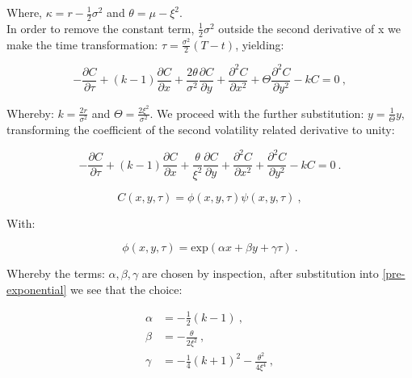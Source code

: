 \documentclass[english,12pt]{article}
\begin{document}
Where, $\kappa = r - \frac{1}{2}{\sigma^{2}}$ and $\theta = \mu - \xi^2$.
\\
\indent In order to remove the constant term, $\frac{1}{2}{\sigma^{2}}$ outside the second derivative of x we make the time transformation: $\tau = \frac{{\sigma^{2}}}{2} (T-t)$, yielding: 

\begin{equation}
\label{pre-exponential} -\frac{\partial C}{\partial \tau} + (k - 1)\frac{\partial C}{\partial x} + \frac{2\theta}{{\sigma^{2}}}\frac{\partial C}{\partial y} + \frac{\partial^2 C}{\partial x^2} + \Theta\frac{\partial^2 C}{\partial y^2} - kC = 0~,
\end{equation}

Whereby: $k = \frac{2r}{{\sigma^{2}}}$ and $\Theta = \frac{2\xi^2}{{\sigma^{2}}}$. We proceed with the further substitution: $y = \frac{1}{\Theta}y$, transforming the coefficient of the second volatility related derivative to unity:

\begin{equation}
-\frac{\partial C}{\partial \tau} + (k - 1)\frac{\partial C}{\partial x} + \frac{\theta}{\xi^2}\frac{\partial C}{\partial y} + \frac{\partial^2 C}{\partial x^2} + \frac{\partial^2 C}{\partial y^2} - kC = 0~.
\end{equation}

\begin{equation}
C(x,y,\tau) = \phi(x,y,\tau)\psi(x,y,\tau)~,
\end{equation}

With: 

\begin{equation}
\phi(x,y,\tau) = \text{exp}(\alpha x + \beta y + \gamma\tau)~.
\end{equation}

Whereby the terms: $\alpha, \beta, \gamma$ are chosen by inspection, after substitution into \ref{pre-exponential} we see that the choice: 

\begin{align}
\alpha &= -\frac{1}{2}(k - 1)~, \\
\beta &= -\frac{\theta}{2\xi^2}~, \\
\gamma &= -\frac{1}{4}(k + 1)^2 -\frac{\theta^2}{4\xi^4}~,
\end{align}
\end{document}
